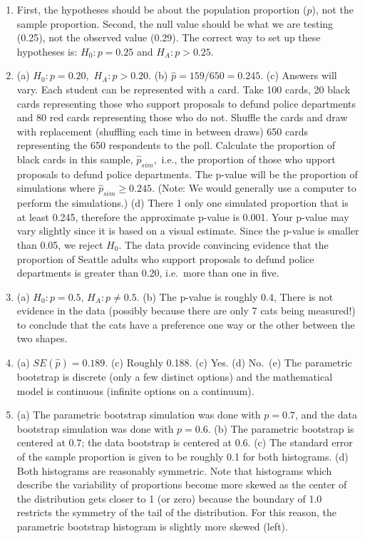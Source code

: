 \documentclass[
  10pt,
  openany]{book}
\providecommand{\tightlist}{%
  \setlength{\itemsep}{0pt}\setlength{\parskip}{0pt}}
\begin{document}
\begin{enumerate}
\def\labelenumi{\arabic{enumi}.}
\tightlist
\item
  First, the hypotheses should be about the population proportion (\(p\)), not the sample proportion. Second, the null value should be what we are testing (0.25), not the observed value (0.29). The correct way to set up these hypotheses is: \(H_0: p = 0.25\) and \(H_A: p > 0.25.\)

  \addtocounter{enumi}{1}
\item
  (a) \(H_0 : p = 0.20,\) \(H_A : p > 0.20.\) (b) \(\hat{p} = 159/650 = 0.245.\) (c) Answers will vary. Each student can be represented with a card. Take 100 cards, 20 black cards representing those who support proposals to defund police departments and 80 red cards representing those who do not. Shuffle the cards and draw with replacement (shuffling each time in between draws) 650 cards representing the 650 respondents to the poll. Calculate the proportion of black cards in this sample, \(\hat{p}_{sim},\) i.e., the proportion of those who upport proposals to defund police departments. The p-value will be the proportion of simulations where \(\hat{p}_{sim} \geq 0.245.\) (Note: We would generally use a computer to perform the simulations.) (d) There 1 only one simulated proportion that is at least 0.245, therefore the approximate p-value is 0.001. Your p-value may vary slightly since it is based on a visual estimate. Since the p-value is smaller than 0.05, we reject \(H_0.\) The data provide convincing evidence that the proportion of Seattle adults who support proposals to defund police departments is greater than 0.20, i.e.~more than one in five.

  \addtocounter{enumi}{1}
\item
  (a) \(H_0: p = 0.5\), \(H_A: p \ne 0.5\). (b) The p-value is roughly 0.4, There is not evidence in the data (possibly because there are only 7 cats being measured!) to conclude that the cats have a preference one way or the other between the two shapes.

  \addtocounter{enumi}{1}
\item
  (a) \(SE(\hat{p}) = 0.189\). (c) Roughly 0.188. (c) Yes. (d) No.~(e) The parametric bootstrap is discrete (only a few distinct options) and the mathematical model is continuous (infinite options on a continuum).

  \addtocounter{enumi}{1}
\item
  (a) The parametric bootstrap simulation was done with \(p=0.7\), and the data bootstrap simulation was done with \(p = 0.6.\) (b) The parametric bootstrap is centered at 0.7; the data bootstrap is centered at 0.6. (c) The standard error of the sample proportion is given to be roughly 0.1 for both histograms. (d) Both histograms are reasonably symmetric. Note that histograms which describe the variability of proportions become more skewed as the center of the distribution gets closer to 1 (or zero) because the boundary of 1.0 restricts the symmetry of the tail of the distribution. For this reason, the parametric bootstrap histogram is slightly more skewed (left).


\end{enumerate}
\end{document}
